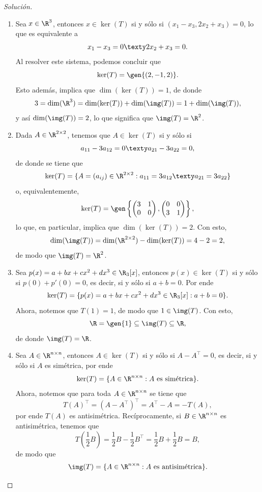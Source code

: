 \documentclass[a4,11pt]{aleph-notas}
\begin{document}
\begin{proof}[Solución]\hspace{0pt}
\begin{enumerate}
    \item Sea $x\in\R^3$, entonces $x\in\ker(T)$ si y sólo si $(x_1-x_3,2x_2+x_3) = 0$, lo que es equivalente a 
    \[
        x_1 - x_3 = 0 \texty 2x_2 + x_3 = 0.
    \]
    Al resolver este sistema, podemos concluir que
    \[
        \ker(T) = \gen\{(2,-1,2)\}.
    \]
    Esto además, implica que $\dim(\ker(T)) = 1$, de donde
    \[
        3 = \dim(\R^3) = \dim(\ker(T)) + \dim(\img(T)) = 1 + \dim(\img(T)),
    \]
    y así $\dim(\img(T)) = 2$, lo que significa que $\img(T)=\R^2$.
    
    \item Dada $A\in\R^{2\times 2}$, tenemos que $A\in\ker(T)$ si y sólo si 
    \[
        a_{11} - 3a_{12} = 0 \texty a_{21} - 3a_{22} = 0,
    \]
    de donde se tiene que
    \[
        \ker(T) = \{A=(a_{ij})\in\R^{2\times 2} :  a_{11}=3a_{12} \texty a_{21}=3a_{22}\}
    \]
    o, equivalentemente,
    \[
        \ker(T) = \gen\left\{ \begin{pmatrix}
                    3 & 1 \\ 0 & 0
        \end{pmatrix}, \begin{pmatrix}
                    0 & 0 \\ 3 & 1
        \end{pmatrix} \right\},
    \]
    lo que, en particular, implica que $\dim(\ker(T)) = 2$. Con esto,
    \[
        \dim(\img(T)) = \dim(\R^{2\times 2}) - \dim(\ker(T)) = 4 - 2 = 2,
    \]
    de modo que $\img(T) = \R^2$.
    
    \item Sea $p(x)=a+bx+cx^2+dx^3\in\R_3[x]$, entonces $p(x)\in \ker(T)$ si y sólo si $p(0)+p'(0)=0$, es decir, si y sólo si $a+b=0$. Por ende
    \[
        \ker(T) = \{ p(x)=a+bx+cx^2+dx^3\in\R_3[x] : a+b = 0 \}.
    \]
    Ahora, notemos que $T(1) = 1$, de modo que $1\in\img(T)$. Con esto,
    \[
        \R = \gen\{1\}\subseteq \img(T) \subseteq\R,
    \]
    de donde $\img(T) = \R$.
    
    \item Sea $A\in\R^{n\times n}$, entonces $A\in\ker(T)$ si y sólo si $A-A^\intercal = 0$, es decir, si y sólo si $A$ es simétrica, por ende
    \[
        \ker(T) = \{A\in\R^{n\times n} : A\text{ es simétrica}\}.
    \]
    Ahora, notemos que para toda $A\in\R^{n\times n}$ se tiene que
    \[
        T(A)^\intercal = (A-A^\intercal)^{\intercal} = A^\intercal - A = -T(A),
    \]
    por ende $T(A)$ es antisimétrica. Recíprocamente, si $B\in\R^{n\times n} $ es antisimétrica, tenemos que
    \[
        T\left( \frac{1}{2}B \right) =  \frac{1}{2}B -  \frac{1}{2}B^\intercal =  \frac{1}{2}B +  \frac{1}{2}B = B,
    \]
    de modo que 
    \[
        \img(T) = \{A\in\R^{n\times n} : A \text{ es antisimétrica}\}.
    \]  
    

\end{enumerate}
\end{proof}
\end{document}
